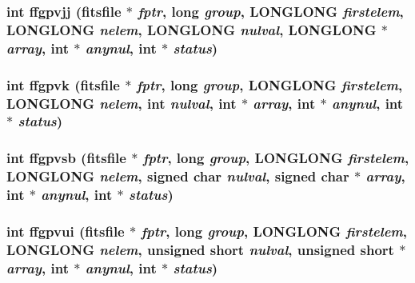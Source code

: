 \subsubsection{\setlength{\rightskip}{0pt plus 5cm}int ffgpvjj (\bf{fitsfile} $\ast$ {\em fptr}, long {\em group}, \bf{LONGLONG} {\em firstelem}, \bf{LONGLONG} {\em nelem}, \bf{LONGLONG} {\em nulval}, \bf{LONGLONG} $\ast$ {\em array}, int $\ast$ {\em anynul}, int $\ast$ {\em status})}\label{fitsio__64_8h_139575618933a88582c86f742063f0c4}


\subsubsection{\setlength{\rightskip}{0pt plus 5cm}int ffgpvk (\bf{fitsfile} $\ast$ {\em fptr}, long {\em group}, \bf{LONGLONG} {\em firstelem}, \bf{LONGLONG} {\em nelem}, int {\em nulval}, int $\ast$ {\em array}, int $\ast$ {\em anynul}, int $\ast$ {\em status})}\label{fitsio__64_8h_0cbefb3447c77eb4e19523c9c0f36464}


\subsubsection{\setlength{\rightskip}{0pt plus 5cm}int ffgpvsb (\bf{fitsfile} $\ast$ {\em fptr}, long {\em group}, \bf{LONGLONG} {\em firstelem}, \bf{LONGLONG} {\em nelem}, signed char {\em nulval}, signed char $\ast$ {\em array}, int $\ast$ {\em anynul}, int $\ast$ {\em status})}\label{fitsio__64_8h_c16f3f63bcf3165ea08e680e0cf19f3a}


\subsubsection{\setlength{\rightskip}{0pt plus 5cm}int ffgpvui (\bf{fitsfile} $\ast$ {\em fptr}, long {\em group}, \bf{LONGLONG} {\em firstelem}, \bf{LONGLONG} {\em nelem}, unsigned short {\em nulval}, unsigned short $\ast$ {\em array}, int $\ast$ {\em anynul}, int $\ast$ {\em status})}\label{fitsio__64_8h_6f7dc3a158e748e6a3d31615a8ba9816}



